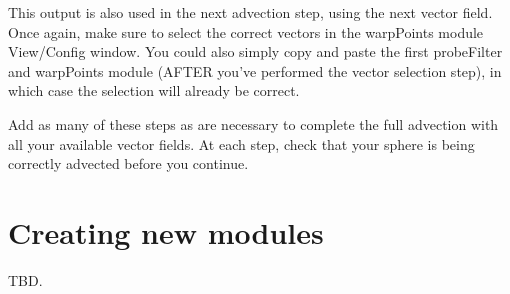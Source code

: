 This output is also used in the next advection step, using the next
vector field.  Once again, make sure to select the correct vectors in
the warpPoints module View/Config window.  You could also simply copy
and paste the first probeFilter and warpPoints module (AFTER you've
performed the vector selection step), in which case the selection will
already be correct.

Add as many of these steps as are necessary to complete the full
advection with all your available vector fields.  At each step, check
that your sphere is being correctly advected before you continue.

\chapter{Creating new modules}
TBD.

%

%
\setfooter{\thepage}{}{}{}{}{\thepage}%
\printindex%


